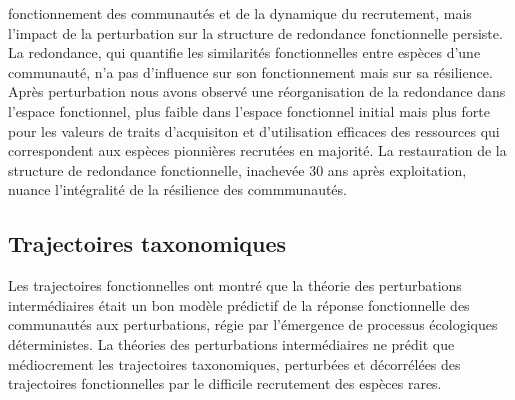 \documentclass[11pt,french,A4paper,extrafontsizes,onecolumn,openright]{memoir}
\begin{document}
fonctionnement des communautés et de la dynamique du recrutement, mais
l'impact de la perturbation sur la structure de redondance fonctionnelle
persiste. La redondance, qui quantifie les similarités fonctionnelles
entre espèces d'une communauté, n'a pas d'influence sur son
fonctionnement mais sur sa résilience. Après perturbation nous avons
observé une réorganisation de la redondance dans l'espace fonctionnel,
plus faible dans l'espace fonctionnel initial mais plus forte pour les
valeurs de traits d'acquisiton et d'utilisation efficaces des ressources
qui correspondent aux espèces pionnières recrutées en majorité. La
restauration de la structure de redondance fonctionnelle, inachevée 30
ans après exploitation, nuance l'intégralité de la résilience des
commmunautés.

\subsection{Trajectoires taxonomiques}\label{trajectoires-taxonomiques}

Les trajectoires fonctionnelles ont montré que la théorie des
perturbations intermédiaires était un bon modèle prédictif de la réponse
fonctionnelle des communautés aux perturbations, régie par l'émergence
de processus écologiques déterministes. La théories des perturbations
intermédiaires ne prédit que médiocrement les trajectoires taxonomiques,
perturbées et décorrélées des trajectoires fonctionnelles par le
difficile recrutement des espèces rares.
\end{document}
